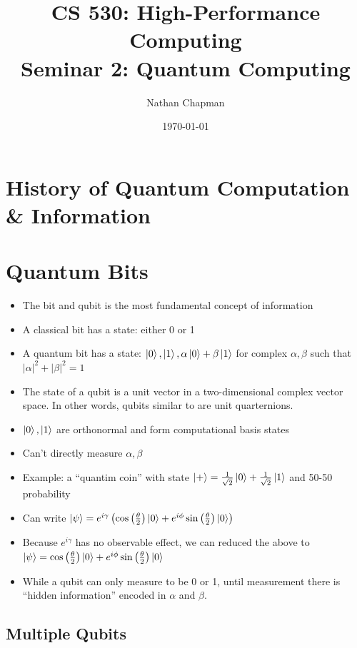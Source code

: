 \documentclass{article}
\title{CS 530: High-Performance Computing \\ Seminar 2: Quantum Computing}
\author{Nathan Chapman}
\affil{Department of Computer Science \\ Central Washington University}
\date{\today}
\begin{document}
\maketitle

\tableofcontents

\section{History of Quantum Computation \& Information}

\section{Quantum Bits}

    \begin{itemize}
        \item The bit and qubit is the most fundamental concept of information
        \item A classical bit has a state: either 0 or 1
        \item A quantum bit   has a state: $\ket{0}, \ket{1}, \alpha \ket{0} + \beta \ket{1}$ for complex $\alpha, \beta$ such that $|\alpha|^2 + |\beta|^2 = 1$
        \item The state of a qubit is a unit vector in a two-dimensional complex vector space.  In other words, qubits similar to are unit quarternions.
        \item $\ket{0}, \ket{1}$ are orthonormal and form computational basis states
        \item Can't directly measure $\alpha, \beta$
        \item Example: a ``quantim coin'' with state $\ket{+} = \frac{1}{\sqrt{2}} \ket{0} + \frac{1}{\sqrt{2}} \ket{1}$ and 50-50 probability
        \item Can write $\ket{\psi} = e^{i \gamma} \left(\cos \left( \frac{\theta}{2} \right) \ket{0} + e^{i \phi} \sin \left( \frac{\theta}{2} \right) \ket{0} \right)$
        \item Because $e^{i \gamma}$ has no observable effect, we can reduced the above to $\ket{\psi} = \cos \left( \frac{\theta}{2} \right) \ket{0} + e^{i \phi} \sin \left( \frac{\theta}{2} \right) \ket{0}$
        \item While a qubit can only measure to be 0 or 1, until measurement there is ``hidden information'' encoded in $\alpha$ and $\beta$.
    \end{itemize}

    \subsection{Multiple Qubits}
\end{document}
